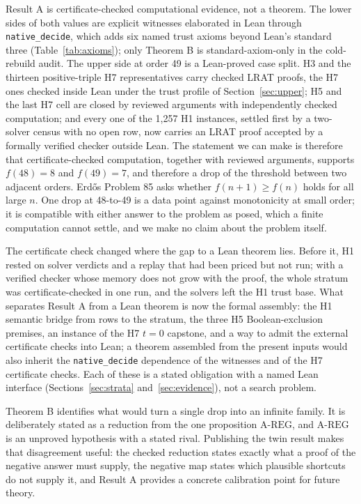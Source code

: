 \documentclass{anvil-paper}
\newcommand{\AREG}{\mathrm{A\text{-}REG}}
\theoremstyle{definition}
\begin{document}
Result A is certificate-checked computational evidence, not a theorem. The lower sides of both values are explicit witnesses elaborated in Lean through \texttt{native\_decide}, which adds six named trust axioms beyond Lean's standard three (Table~\ref{tab:axioms}); only Theorem B is standard-axiom-only in the cold-rebuild audit. The upper side at order 49 is a Lean-proved case split. H3 and the thirteen positive-triple H7 representatives carry checked LRAT proofs, the H7 ones checked inside Lean under the trust profile of Section~\ref{sec:upper}; H5 and the last H7 cell are closed by reviewed arguments with independently checked computation; and every one of the 1,257 H1 instances, settled first by a two-solver census with no open row, now carries an LRAT proof accepted by a formally verified checker outside Lean. The statement we can make is therefore that certificate-checked computation, together with reviewed arguments, supports $f(48)=8$ and $f(49)=7$, and therefore a drop of the threshold between two adjacent orders. Erdős Problem 85 asks whether $f(n+1)\ge f(n)$ holds for all large $n$. One drop at 48-to-49 is a data point against monotonicity at small order; it is compatible with either answer to the problem as posed, which a finite computation cannot settle, and we make no claim about the problem itself.

The certificate check changed where the gap to a Lean theorem lies. Before it, H1 rested on solver verdicts and a replay that had been priced but not run; with a verified checker whose memory does not grow with the proof, the whole stratum was certificate-checked in one run, and the solvers left the H1 trust base. What separates Result A from a Lean theorem is now the formal assembly: the H1 semantic bridge from rows to the stratum, the three H5 Boolean-exclusion premises, an instance of the H7 $t=0$ capstone, and a way to admit the external certificate checks into Lean; a theorem assembled from the present inputs would also inherit the \texttt{native\_decide} dependence of the witnesses and of the H7 certificate checks. Each of these is a stated obligation with a named Lean interface (Sections~\ref{sec:strata} and~\ref{sec:evidence}), not a search problem.

Theorem B identifies what would turn a single drop into an infinite family. It is deliberately stated as a reduction from the one proposition $\AREG$, and $\AREG$ is an unproved hypothesis with a stated rival. Publishing the twin result makes that disagreement useful: the checked reduction states exactly what a proof of the negative answer must supply, the negative map states which plausible shortcuts do not supply it, and Result A provides a concrete calibration point for future theory.
\end{document}
